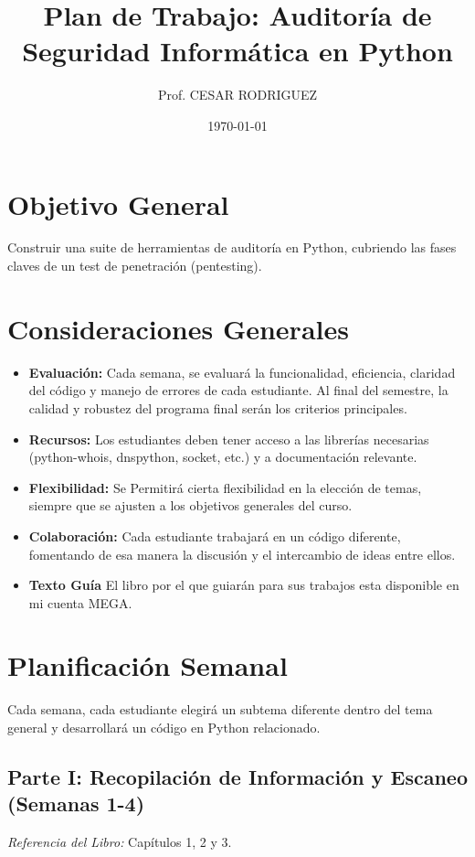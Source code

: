 \documentclass{article}
\title{Plan de Trabajo: Auditoría de Seguridad Informática en Python}
\author{Prof. CESAR RODRIGUEZ}
\date{\today}
\begin{document}
\maketitle

\section*{Objetivo General}
Construir una suite de herramientas de auditoría en Python, cubriendo las fases claves de un test de penetración (pentesting).

\section*{Consideraciones Generales}
\begin{itemize}
    \item \textbf{Evaluación:} Cada semana, se evaluará la funcionalidad, eficiencia, claridad del código y manejo de errores de cada estudiante. Al final del semestre, la calidad y robustez del programa final serán los criterios principales.
    \item \textbf{Recursos:} Los estudiantes deben tener acceso a las librerías necesarias (python-whois, dnspython, socket, etc.) y a documentación relevante.
    \item \textbf{Flexibilidad:} Se Permitirá cierta flexibilidad en la elección de temas, siempre que se ajusten a los objetivos generales del curso.
    \item \textbf{Colaboración:} Cada estudiante trabajará en un código diferente, fomentando de esa manera la discusión y el intercambio de ideas entre ellos.
    \item \textbf{Texto Guía} El libro por el que guiarán para sus trabajos esta disponible en mi cuenta MEGA.
\end{itemize}

\section*{Planificación Semanal}
Cada semana, cada estudiante elegirá un subtema diferente dentro del tema general y desarrollará un código en Python relacionado.

\subsection*{Parte I: Recopilación de Información y Escaneo (Semanas 1-4)}
\textit{Referencia del Libro:} Capítulos 1, 2 y 3.
\end{document}
